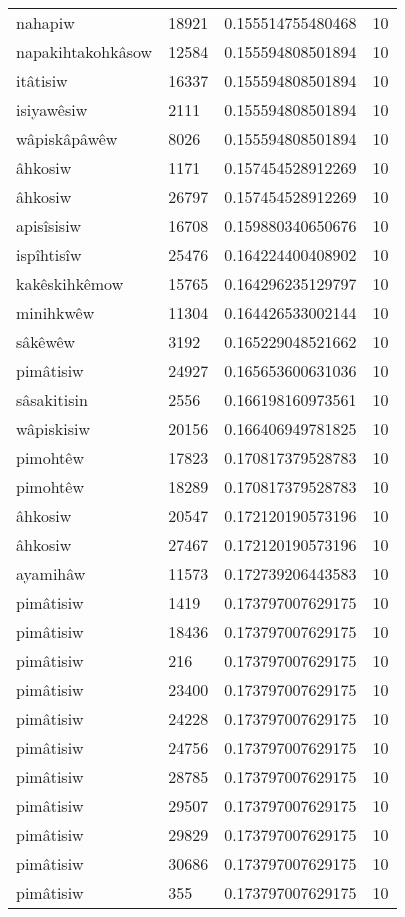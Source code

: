 \begin{longtable}{llll}
nahapiw & 18921 & 0.155514755480468 & 10 \\
napakihtakohkâsow & 12584 & 0.155594808501894 & 10 \\
itâtisiw & 16337 & 0.155594808501894 & 10 \\
isiyawêsiw & 2111 & 0.155594808501894 & 10 \\
wâpiskâpâwêw & 8026 & 0.155594808501894 & 10 \\
âhkosiw & 1171 & 0.157454528912269 & 10 \\
âhkosiw & 26797 & 0.157454528912269 & 10 \\
apisîsisiw & 16708 & 0.159880340650676 & 10 \\
ispîhtisîw & 25476 & 0.164224400408902 & 10 \\
kakêskihkêmow & 15765 & 0.164296235129797 & 10 \\
minihkwêw & 11304 & 0.164426533002144 & 10 \\
sâkêwêw & 3192 & 0.165229048521662 & 10 \\
pimâtisiw & 24927 & 0.165653600631036 & 10 \\
sâsakitisin & 2556 & 0.166198160973561 & 10 \\
wâpiskisiw & 20156 & 0.166406949781825 & 10 \\
pimohtêw & 17823 & 0.170817379528783 & 10 \\
pimohtêw & 18289 & 0.170817379528783 & 10 \\
âhkosiw & 20547 & 0.172120190573196 & 10 \\
âhkosiw & 27467 & 0.172120190573196 & 10 \\
ayamihâw & 11573 & 0.172739206443583 & 10 \\
pimâtisiw & 1419 & 0.173797007629175 & 10 \\
pimâtisiw & 18436 & 0.173797007629175 & 10 \\
pimâtisiw & 216 & 0.173797007629175 & 10 \\
pimâtisiw & 23400 & 0.173797007629175 & 10 \\
pimâtisiw & 24228 & 0.173797007629175 & 10 \\
pimâtisiw & 24756 & 0.173797007629175 & 10 \\
pimâtisiw & 28785 & 0.173797007629175 & 10 \\
pimâtisiw & 29507 & 0.173797007629175 & 10 \\
pimâtisiw & 29829 & 0.173797007629175 & 10 \\
pimâtisiw & 30686 & 0.173797007629175 & 10 \\
pimâtisiw & 355 & 0.173797007629175 & 10 \\

\end{longtable}
